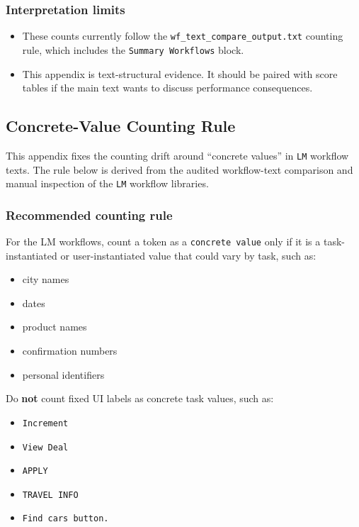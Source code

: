 \subsubsection{Interpretation limits}

\begin{itemize}
\tightlist
\item
  These counts currently follow the
  \texttt{wf\_text\_compare\_output.txt} counting rule, which includes
  the \texttt{Summary\ Workflows} block.
\item
  This appendix is text-structural evidence. It should be paired with
  score tables if the main text wants to discuss performance consequences.
\end{itemize}


\clearpage
\subsection{Concrete-Value Counting Rule}\label{app:C2}

This appendix fixes the counting drift around ``concrete values'' in
\texttt{LM} workflow texts. The rule below is derived from the audited
workflow-text comparison and manual inspection of the \texttt{LM}
workflow libraries.

\subsubsection{Recommended counting
rule}

For the LM workflows, count a token as a \texttt{concrete\ value} only
if it is a task-instantiated or user-instantiated value that could vary
by task, such as:

\begin{itemize}
\tightlist
\item
  city names
\item
  dates
\item
  product names
\item
  confirmation numbers
\item
  personal identifiers
\end{itemize}

Do \textbf{not} count fixed UI labels as concrete task values, such as:

\begin{itemize}
\tightlist
\item
  \texttt{Increment}
\item
  \texttt{View\ Deal}
\item
  \texttt{APPLY}
\item
  \texttt{TRAVEL\ INFO}
\item
  \texttt{Find\ cars\ button.}
\end{itemize}

